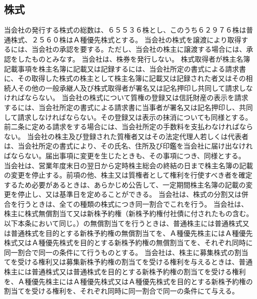 \documentclass[10pt,a4paper,uplatex]{jsarticle}
\begin{document}
\subsection{株式}
当会社の発行する株式の総数は、６５５３６株とし、このうち６２９７６株は普通株式、２５６０株はＡ種優先株式とする。
当会社の株式を譲渡により取得するには、当会社の承認を要する。ただし、当会社の株主に譲渡する場合には、承認をしたものとみなす。
当会社は、株券を発行しない。
株式取得者が株主名簿記載事項を株主名簿に記載又は記録するには、当会社所定の書式による請求書に、その取得した株式の株主として株主名簿に記載又は記録された者又はその相続人その他の一般承継人及び株式取得者が署名又は記名押印し共同して請求しなければならない。
当会社の株式について質権の登録又は信託財産の表示を請求するには、当会社所定の書式による請求書に当事者が署名又は記名押印し、共同して請求しなければならない。その登録又は表示の抹消についても同様とする。
前二条に定める請求をする場合には、当会社所定の手数料を支払わなければならない。
当会社の株主及び登録された質権者又はその法定代理人若しくは代表者は、当会社所定の書式により、その氏名、住所及び印鑑を当会社に届け出なければならない。届出事項に変更を生じたときも、その事項につき、同様とする。
当会社は、営業年度末日の翌日から定時株主総会の終結の日まで株主名簿の記載の変更を停止する。前項の他、株主又は質権者として権利を行使すべき者を確定するため必要があるときは、あらかじめ公告して、一定期間株主名簿の記載の変更を停止し、又は基準日を定めることができる。
当会社は、株式の分割又は併合を行うときは、全ての種類の株式につき同一割合でこれを行う。
\term 当会社は、株主に株式無償割当て又は新株予約権（新株予約権付社債に付されたもの含む。以下本条において同じ。）の無償割当てを行うときは、普通株主には普通株式又は普通株式を目的とする新株予約権の無償割当てを、Ａ種優先株主にはＡ種優先株式又はＡ種優先株式を目的とする新株予約権の無償割当てを、それぞれ同時に同一割合で同一の条件にて行うものとする。
\term 当会社は、株主に募集株式の割当てを受ける権利又は募集新株予約権の割当てを受ける権利を与えるときは、普通株主には普通株式又は普通株式を目的とする新株予約権の割当てを受ける権利を、Ａ種優先株主にはＡ種優先株式又はＡ種優先株式を目的とする新株予約権の割当てを受ける権利を、それぞれ同時に同一割合で同一の条件にて与える。
\end{document}
